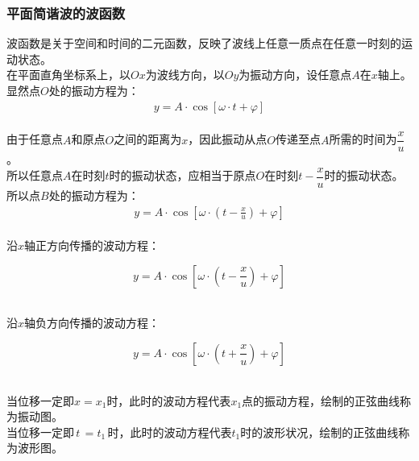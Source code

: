 \documentclass[UTF8]{ctexart}
\begin{document}
\newpage

\subsubsection{平面简谐波的波函数}
    波函数是关于空间和时间的二元函数，反映了波线上任意一质点在任意一时刻的运动状态。\\[3mm]
    在平面直角坐标系上，以$Ox$为波线方向，以$Oy$为振动方向，设任意点$A$在$x$轴上。\\[3mm]
    显然点$O$处的振动方程为：
    \setcounter{equation}{0}
    \begin{align}
        y=A\cdot\cos{\left[\omega\cdot t+\varphi\right]}
    \end{align}\\
    由于任意点$A$和原点$O$之间的距离为$x$，因此振动从点$O$传递至点$A$所需的时间为$\dfrac{x}{u}$。\\[3mm]
    所以任意点$A$在时刻$t$时的振动状态，应相当于原点$O$在时刻$t-\dfrac{x}{u}$时的振动状态。\\[5mm]
    所以点$B$处的振动方程为：
    \begin{align}
        y=A\cdot\cos{\left[\omega\cdot\left(t-\frac{x}{u}\right)+\varphi\right]}
    \end{align}\\
    沿$x$轴正方向传播的波动方程：
    \begin{large}
        \begin{equation*}
            y=A\cdot\cos{\left[\omega\cdot\left(t-\frac{x}{u}\right)+\varphi\right]}
        \end{equation*}
    \end{large}\\
    沿$x$轴负方向传播的波动方程：
    \begin{large}
        \begin{equation*}
            y=A\cdot\cos{\left[\omega\cdot\left(t+\frac{x}{u}\right)+\varphi\right]}
        \end{equation*}
    \end{large}\\
    当位移一定即$x=x_1$时，此时的波动方程代表$x_1$点的振动方程，绘制的正弦曲线称为振动图。\\[3mm]
    当位移一定即$\,t\,=t_1\,$时，此时的波动方程代表$t_1$时的波形状况，绘制的正弦曲线称为波形图。\\[3mm]

\newpage
\end{document}
